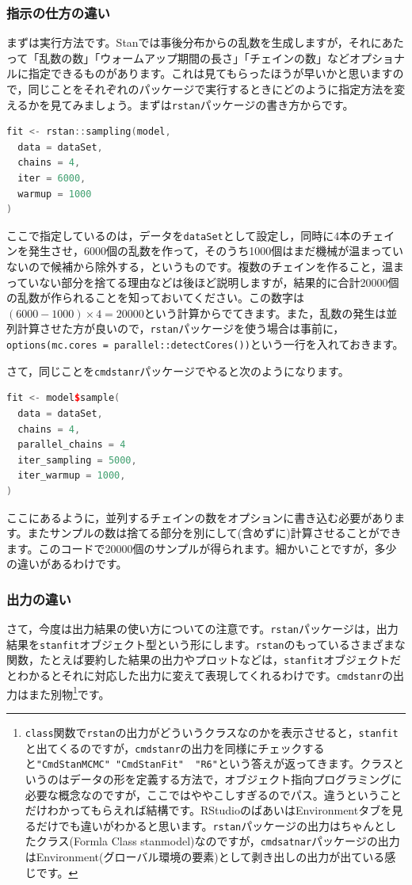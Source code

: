 \documentclass{ltjsbook}
\begin{document}
\subsubsection{指示の仕方の違い}
まずは実行方法です。Stanでは事後分布からの乱数を生成しますが，それにあたって「乱数の数」「ウォームアップ期間の長さ」「チェインの数」などオプショナルに指定できるものがあります。これは見てもらったほうが早いかと思いますので，同じことをそれぞれのパッケージで実行するときにどのように指定方法を変えるかを見てみましょう。まずは\verb|rstan|パッケージの書き方からです。
\begin{lstlisting}[language=C++,label={code:PRE_03rstan},caption={rstanのスタイル}]
fit <- rstan::sampling(model,
  data = dataSet,
  chains = 4,
  iter = 6000,
  warmup = 1000
)
\end{lstlisting}
ここで指定しているのは，データを\verb|dataSet|として設定し，同時に4本のチェインを発生させ，6000個の乱数を作って，そのうち1000個はまだ機械が温まっていないので候補から除外する，というものです。複数のチェインを作ること，温まっていない部分を捨てる理由などは後ほど説明しますが，結果的に合計20000個の乱数が作られることを知っておいてください。この数字は$(6000-1000)\times4 = 20000$という計算からでてきます。また，乱数の発生は並列計算させた方が良いので，\verb|rstan|パッケージを使う場合は事前に，\verb|options(mc.cores = parallel::detectCores())|という一行を入れておきます。

さて，同じことを\verb|cmdstanr|パッケージでやると次のようになります。
\begin{lstlisting}[language=C++,label={code:PRE_04cmd},caption={cmdstanrのスタイル}]
fit <- model$sample(
  data = dataSet,
  chains = 4,
  parallel_chains = 4
  iter_sampling = 5000,
  iter_warmup = 1000,
)
\end{lstlisting}
ここにあるように，並列するチェインの数をオプションに書き込む必要があります。またサンプルの数は捨てる部分を別にして(含めずに)計算させることができます。このコードで20000個のサンプルが得られます。細かいことですが，多少の違いがあるわけです。

\subsubsection{出力の違い}
さて，今度は出力結果の使い方についての注意です。\verb|rstan|パッケージは，出力結果を\verb|stanfit|オブジェクト型という形にします。\verb|rstan|のもっているさまざまな関数，たとえば要約した結果の出力やプロットなどは，\verb|stanfit|オブジェクトだとわかるとそれに対応した出力に変えて表現してくれるわけです。\verb|cmdstanr|の出力はまた別物\footnote{\verb|class|関数で\verb|rstan|の出力がどういうクラスなのかを表示させると，\verb|stanfit|と出てくるのですが，\verb|cmdstanr|の出力を同様にチェックすると\verb|"CmdStanMCMC" "CmdStanFit"  "R6"|という答えが返ってきます。クラスというのはデータの形を定義する方法で，オブジェクト指向プログラミングに必要な概念なのですが，ここではややこしすぎるのでパス。違うということだけわかってもらえれば結構です。RStudioのばあいはEnvironmentタブを見るだけでも違いがわかると思います。\verb|rstan|パッケージの出力はちゃんとしたクラス(Formla Class stanmodel)なのですが，\verb|cmdsatnar|パッケージの出力はEnvironment(グローバル環境の要素)として剥き出しの出力が出ている感じです。}です。
\end{document}
